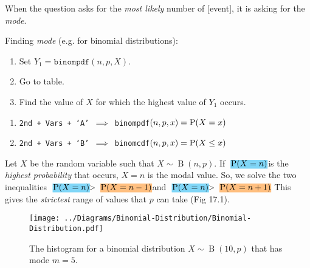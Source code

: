 \documentclass[oneside]{book}
\newcommand{\highlight}[2][red!50]{\mathpalette{\highlightwithstyle[#1]}{#2}}
\newcommand{\highlightwithstyle}[3][red!50]{
  \begingroup                         %
    \sbox0{$\mathsurround 0pt #2#3$}%
    \setlength{\fboxsep}{.5pt}        %
    \sbox2{\hspace{-.5pt}%
      \colorbox{#1}{\usebox0}%
    }%
    \dp2=\dp0 \ht2=\ht0 \wd2=\wd0     %
    \box2                             %
  \endgroup                           %
}
\begin{document}
\begin{note}
  When the question asks for the \emph{most likely} number of [event], it is asking for the \emph{mode}.
  \end{note}
\begin{GCSkills}{}
  Finding \emph{mode} (e.g. for binomial distributions):
  \begin{enumerate}
    \item Set \(Y_1=\texttt{binompdf}(n,p,X)\).
    \item Go to table.
    \item Find the value of \(X\) for which the highest value of \(Y_1\) occurs.
  \end{enumerate}
\end{GCSkills}
\begin{GCSkills}{}
  \begin{enumerate}
    \item \texttt{2nd + Vars + `A' \(\implies\) binompdf\((n,p,x)=\operatorname{P}(X=x)\)}
    \item \texttt{2nd + Vars + `B' \(\implies\) binomcdf\((n,p,x)=\operatorname{P}(X\leq x)\)}
  \end{enumerate}
\end{GCSkills}
\begin{note}
  Let \(X\) be the random variable such that \(X \sim \operatorname{B}(n,p)\). If \(\highlight[cyan!50]{\Prob(X=n)}\) is the \emph{highest probability} that occurs, \(X=n\) is the modal value. So, we solve the two inequalities \(\highlight[cyan!50]{\Prob(X=n)}>\highlight[orange!50]{\Prob(X=n-1)}\) and \(\highlight[cyan!50]{\Prob(X=n)}>\highlight[orange!50]{\Prob(X=n+1)}\). This gives the \emph{strictest} range of values that \(p\) can take (Fig 17.1).
\end{note}
\begin{figure}[H]
  \centering
  \texttt{[image: ../Diagrams/Binomial-Distribution/Binomial-Distribution.pdf]}
  \caption{The histogram for a binomial distribution \(X\sim\operatorname{B}(10,p)\) that has mode \(m=5\).}
  \label{fig:binomial-distribution}
\end{figure}
\end{document}
